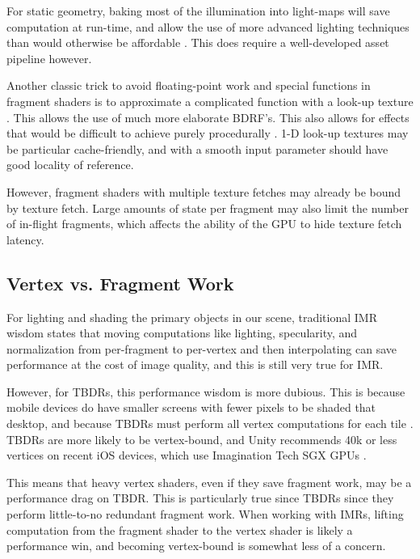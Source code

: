 For static geometry, baking most of the illumination into light-maps will save
computation at run-time, and allow the use of more advanced lighting techniques
than would otherwise be affordable \cite{lightmaps} \cite{unity_graphics_perf}.
This does require a well-developed asset pipeline however.

Another classic trick to avoid floating-point work and special functions in
fragment shaders is to approximate a complicated function with a look-up
texture \cite{ios_shader_tricks}.  This allows the use of much more elaborate
BDRF's.  This also allows for effects that would be difficult to achieve purely
procedurally \cite{illustrative}.  1-D look-up textures may be particular
cache-friendly, and with a smooth input parameter should have good locality of
reference.  

However, fragment shaders with multiple texture fetches may already be bound by
texture fetch.  Large amounts of state per fragment may also limit the number
of in-flight fragments, which affects the ability of the GPU to hide texture
fetch latency.

\subsection{Vertex vs. Fragment
Work}\label{Jon-McCaffrey-Vertex-vs-Fragment-Work}

For lighting and shading the primary objects in our scene, traditional IMR
wisdom states that moving computations like lighting, specularity, and
normalization from per-fragment to per-vertex and then interpolating can save
performance at the cost of image quality, and this is still very true for IMR.

However, for TBDRs, this performance wisdom is more dubious.  This is because
mobile devices do have smaller screens with fewer pixels to be shaded that
desktop, and because TBDRs must perform all vertex computations for each tile
\cite{apple_vertex}.  TBDRs are more likely to be vertex-bound, and Unity
recommends 40k or less vertices on recent iOS devices, which use Imagination
Tech SGX GPUs \cite{unity_graphics_perf}.

This means that heavy vertex shaders, even if they save fragment work, may be a
performance drag on TBDR.  This is particularly true since TBDRs since they
perform little-to-no redundant fragment work.  When working with IMRs, lifting
computation from the fragment shader to the vertex shader is likely a
performance win, and becoming vertex-bound is somewhat less of a concern.

